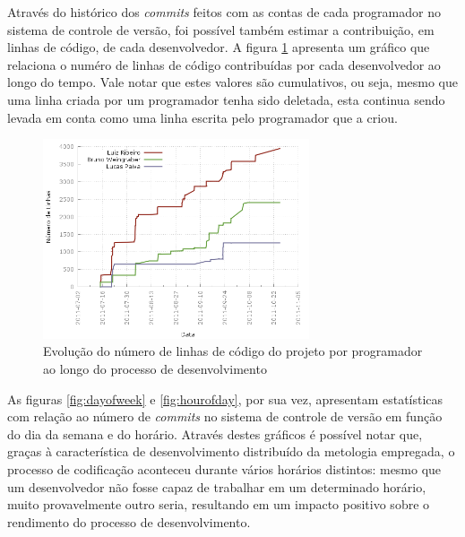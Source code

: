 Através do histórico dos \emph{commits} feitos com as contas de cada programador no sistema de controle de versão, foi possível também estimar a contribuição, em linhas de código, de cada desenvolvedor.
A figura \ref{fig:linesofcodebyauthor} apresenta um gráfico que relaciona o numéro de linhas de código contribuídas por cada desenvolvedor ao longo do tempo.
Vale notar que estes valores são cumulativos, ou seja, mesmo que uma linha criada por um programador tenha sido deletada, esta continua sendo levada em conta como uma linha escrita pelo programador que a criou.


\begin{figure}[!htb]
	\centering
	\includegraphics[width=0.7\textwidth]{./plots/lines_of_code_by_author.png}
	\caption[Evolução do número de linhas de código por programador]{Evolução do número de linhas de código do projeto por programador ao longo do processo de desenvolvimento}
	\label{fig:linesofcodebyauthor}
\end{figure}

As figuras \ref{fig:dayofweek} e \ref{fig:hourofday}, por sua vez, apresentam estatísticas com relação ao número de \emph{commits} no sistema de controle de versão em função do dia da semana e do horário.
Através destes gráficos é possível notar que, graças à característica de desenvolvimento distribuído da metologia empregada, o processo de codificação aconteceu durante vários horários distintos: mesmo que um desenvolvedor não fosse capaz de trabalhar em um determinado horário, muito provavelmente outro seria, resultando em um impacto positivo sobre o rendimento do processo de desenvolvimento.

